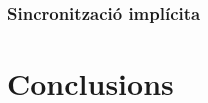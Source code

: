 \documentclass{tfgitic}[2024/07/01]
\begin{document}
{%



\subsection{Sincronització implícita}


\chapter{Conclusions}

}
\end{document}
